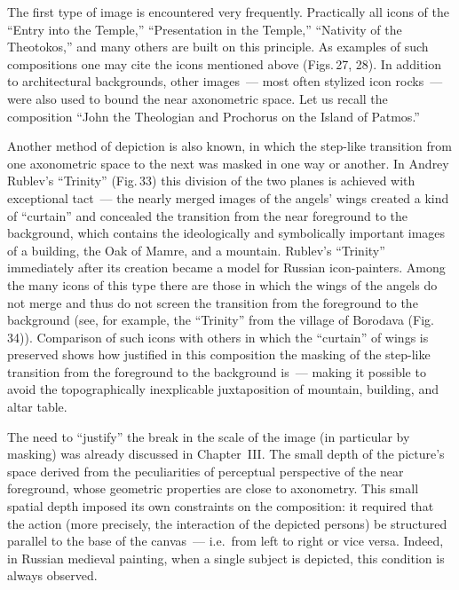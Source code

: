 The first type of image is encountered very frequently.  Practically all icons of the
``Entry into the Temple,'' ``Presentation in the Temple,'' ``Nativity of the
Theotokos,'' and many others are built on this principle.  As examples of such
compositions one may cite the icons mentioned above (Figs.\,27, 28).  In addition to
architectural backgrounds, other images~--- most often stylized icon rocks~--- were also
used to bound the near axonometric space.  Let us recall the composition ``John the
Theologian and Prochorus on the Island of Patmos.''


Another method of depiction is also known, in which the step-like transition from one
axonometric space to the next was masked in one way or another.  In Andrey Rublev's
``Trinity'' (Fig.\,33) this division of the two planes is achieved with exceptional
tact~--- the nearly merged images of the angels' wings created a kind of ``curtain'' and
concealed the transition from the near foreground to the background, which contains the
ideologically and symbolically important images of a building, the Oak of Mamre, and
a mountain.  Rublev's ``Trinity'' immediately after its creation became a model for
Russian icon-painters.  Among the many icons of this type there are those in which
the wings of the angels do not merge and thus do not screen the transition from the
foreground to the background (see, for example, the ``Trinity'' from the village of
Borodava (Fig.\,34)).  Comparison of such icons with others in which the ``curtain'' of
wings is preserved shows how justified in this composition the masking of the step-like
transition from the foreground to the background is~--- making it possible to avoid the
topographically inexplicable juxtaposition of mountain, building, and altar table.

The need to ``justify'' the break in the scale of the image (in particular by masking)
was already discussed in Chapter~III.  The small depth of the picture's space derived
from the peculiarities of perceptual perspective of the near foreground, whose geometric
properties are close to axonometry.  This small spatial depth imposed its own
constraints on the composition: it required that the action (more precisely, the
interaction of the depicted persons) be structured parallel to the base of the canvas~---
i.e.\ from left to right or vice versa.  Indeed, in Russian medieval painting, when a
single subject is depicted, this condition is always observed.


